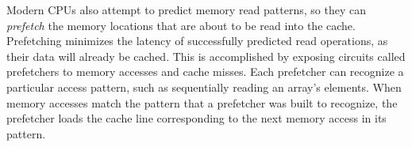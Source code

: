 
Modern CPUs also attempt to predict memory read patterns, so they can
\textit{prefetch} the memory locations that are about to be read into the
cache. Prefetching minimizes the latency of successfully predicted read
operations, as their data will already be cached. This is accomplished by
exposing circuits called prefetchers to memory accesses and cache misses. Each
prefetcher can recognize a particular access pattern, such as sequentially
reading an array's elements. When memory accesses match the pattern that a
prefetcher was built to recognize, the prefetcher loads the cache line
corresponding to the next memory access in its pattern.
